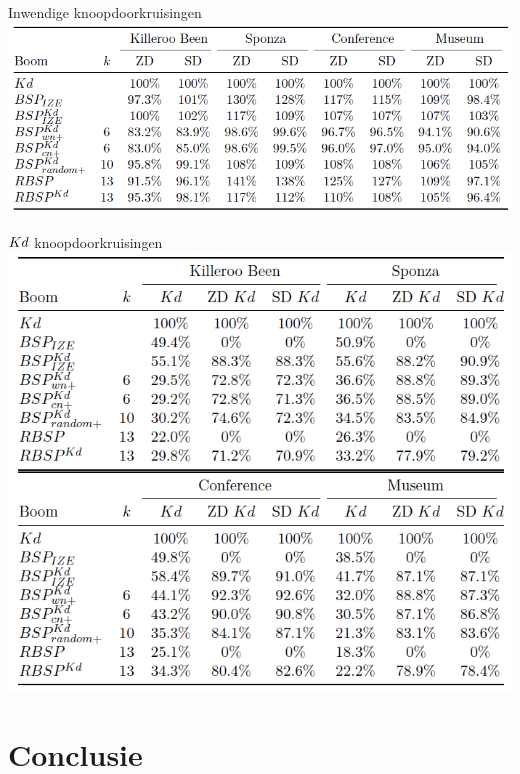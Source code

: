 \documentclass[11pt,t]{beamer}
\begin{document}
\begin{frame}[c]{Inwendige knoopdoorkruisingen}
	\includegraphics[width=.9\paperwidth]{graphics/doorkruisingen}
\end{frame}

\begin{frame}[c]{$Kd$ knoopdoorkruisingen}
	\includegraphics[height=.75\paperheight]{graphics/kdknopen}
\end{frame}

\section{Conclusie}
\end{document}
